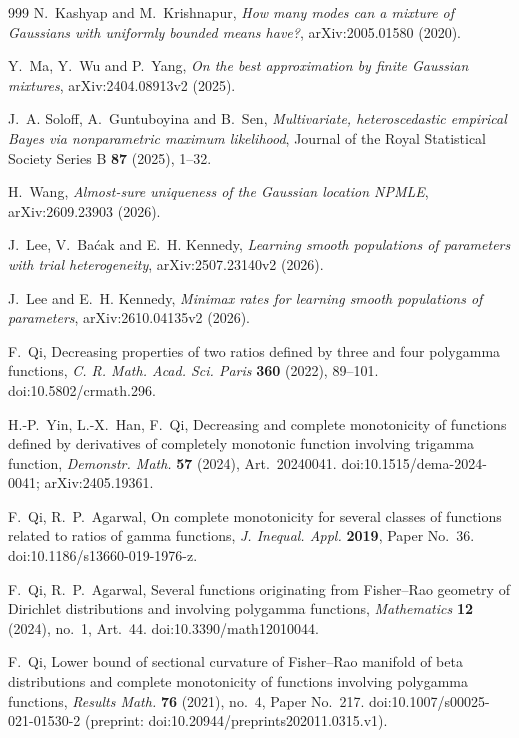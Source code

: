 \documentclass[11pt]{amsart}
\theoremstyle{definition}
\theoremstyle{remark}
\begin{document}
\begin{thebibliography}{999}
N.~Kashyap and M.~Krishnapur,
\emph{How many modes can a mixture of Gaussians with uniformly bounded means have?},
arXiv:2005.01580 (2020).

Y.~Ma, Y.~Wu and P.~Yang,
\emph{On the best approximation by finite Gaussian mixtures},
arXiv:2404.08913v2 (2025).

J.~A. Soloff, A.~Guntuboyina and B.~Sen,
\emph{Multivariate, heteroscedastic empirical Bayes via nonparametric maximum likelihood},
Journal of the Royal Statistical Society Series B \textbf{87} (2025), 1--32.

H.~Wang,
\emph{Almost-sure uniqueness of the Gaussian location NPMLE},
arXiv:2609.23903 (2026).

J.~Lee, V.~Ba\'cak and E.~H. Kennedy,
\emph{Learning smooth populations of parameters with trial heterogeneity},
arXiv:2507.23140v2 (2026).

J.~Lee and E.~H. Kennedy,
\emph{Minimax rates for learning smooth populations of parameters},
arXiv:2610.04135v2 (2026).

F.~Qi, Decreasing properties of two ratios defined by three and four polygamma functions,
\emph{C. R. Math. Acad. Sci. Paris} \textbf{360} (2022), 89--101.
doi:10.5802/crmath.296.

H.-P.~Yin, L.-X.~Han, F.~Qi, Decreasing and complete monotonicity of functions defined by
derivatives of completely monotonic function involving trigamma function,
\emph{Demonstr. Math.} \textbf{57} (2024), Art.~20240041.
doi:10.1515/dema-2024-0041; arXiv:2405.19361.

F.~Qi, R.~P.~Agarwal, On complete monotonicity for several classes of functions related to
ratios of gamma functions, \emph{J. Inequal. Appl.} \textbf{2019}, Paper No.~36.
doi:10.1186/s13660-019-1976-z.

F.~Qi, R.~P.~Agarwal, Several functions originating from Fisher--Rao geometry of Dirichlet
distributions and involving polygamma functions, \emph{Mathematics} \textbf{12} (2024), no.~1,
Art.~44. doi:10.3390/math12010044.

F.~Qi, Lower bound of sectional curvature of Fisher--Rao manifold of beta distributions and
complete monotonicity of functions involving polygamma functions, \emph{Results Math.}
\textbf{76} (2021), no.~4, Paper No.~217. doi:10.1007/s00025-021-01530-2
(preprint: doi:10.20944/preprints202011.0315.v1).


\end{thebibliography}
\end{document}
